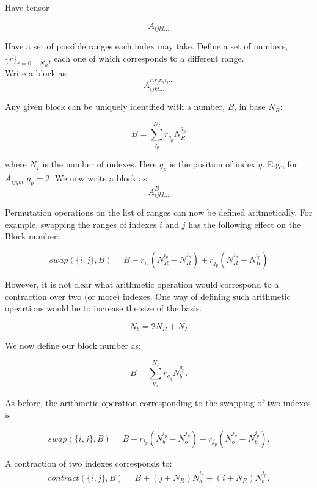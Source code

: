 \documentclass[12pt]{article}
\begin{document}
Have tensor

\begin{equation}
A_{ijkl...}
\end{equation}

\noindent Have a set of possible ranges each index may take. Define a set of numbers, $\{r\}_{r=0,..,N_{R}} $,
each one of which corresponds to a different range.\\

\noindent Write a block as
\begin{equation}
A_{ijkl...}^{r_{i} r_{j}r_{k}r_{l}...}
\end{equation}

\noindent Any given block can be uniquely identified with a number, $B$, in base $N_{R}$:

\begin{equation}
B = \sum_{q_{p}}^{N_{I}} r_{q_{p}}N_{R}^{q_{p}}
\end{equation}

\noindent where $N_{I}$ is the number of indexes. Here $q_{p}$ is the position of index $q$. E.g., 
for $A_{ijqkl}$  $q_{p} = 2$.  We now write a block as
\begin{equation}
A_{ijkl...}^{B}
\end{equation}

\noindent Permutation operations on the list of ranges can now be defined aritmetically. For example,
swapping the ranges of indexes $i$ and $j$ has the following effect on the Block number:
 
\begin{equation}
swap(\{i,j\},B)  = B  - r_{i_{p}}(N_{R}^{i_{p}} - N_{R}^{j_{p}}) + r_{j_{p}}(N_{R}^{j_{p}} - N_{R}^{i_{p}})
\end{equation}

\noindent  However, it is not clear what arithmetic operation would correspond to a contraction over two (or more)
indexes. One way of defining such arithmetic opeartions would be to increase the size of the basis.

\begin{equation}
N_{b} = 2N_{R} + N_{I}
\end{equation}

\noindent We now define our block number as:

\begin{equation}
B = \sum_{q_{p}}^{N_{I}} r_{q_{p}}N_{b}^{q_{p}}.
\end{equation}

\noindent As before, the arithmetic operation corresponding to the swapping of two indexes is
 
\begin{equation}
swap(\{i,j\},B)  = B  - r_{i_{p}}(N_{b}^{i_{p}} - N_{b}^{j_{p}}) + r_{j_{p}}(N_{b}^{j_{p}} - N_{b}^{i_{p}}).
\end{equation}

\noindent A contraction of two indexes corresponds to:
\begin{equation}
contract(\{i,j\},B)  = B + (j+N_{R})N_{b}^{i_{p}} + (i+N_{R})N_{b}^{j_{p}}.
\end{equation}
\end{document}

